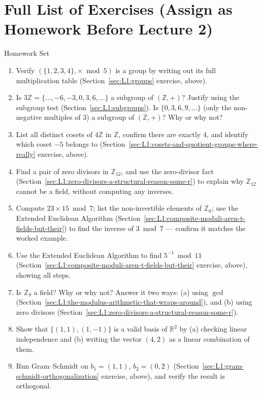 \section{Full List of Exercises (Assign as Homework Before Lecture 2)}
\label{sec:L1:full-list-of-exercises-assign-as-homewor}

\begin{exercisebox}{Homework Set}
\begin{enumerate}[leftmargin=*]
  \item Verify $(\{1,2,3,4\}, \times \bmod 5)$ is a group by writing out its full multiplication table (Section~\ref{sec:L1:groups} exercise, above).
  \item Is $3\mathbb{Z} = \{\ldots,-6,-3,0,3,6,\ldots\}$ a subgroup of $(\mathbb{Z},+)$? Justify using the subgroup test (Section~\ref{sec:L1:subgroups}). Is $\{0,3,6,9,\ldots\}$ (only the non-negative multiples of $3$) a subgroup of $(\mathbb{Z},+)$? Why or why not?
  \item List all distinct cosets of $4\mathbb{Z}$ in $\mathbb{Z}$, confirm there are exactly $4$, and identify which coset $-5$ belongs to (Section~\ref{sec:L1:cosets-and-quotient-groups-where-really} exercise, above).
  \item Find a pair of zero divisors in $\mathbb{Z}_{12}$, and use the zero-divisor fact (Section~\ref{sec:L1:zero-divisors-a-structural-reason-some-r}) to explain why $\mathbb{Z}_{12}$ cannot be a field, without computing any inverses.
  \item Compute $23 \times 15 \bmod 7$; list the non-invertible elements of $\mathbb{Z}_8$; use the Extended Euclidean Algorithm (Section~\ref{sec:L1:composite-moduli-aren-t-fields-but-their}) to find the inverse of $3 \bmod 7$ --- confirm it matches the worked example.
  \item Use the Extended Euclidean Algorithm to find $5^{-1} \bmod 11$ (Section~\ref{sec:L1:composite-moduli-aren-t-fields-but-their} exercise, above), showing all steps.
  \item Is $\mathbb{Z}_9$ a field? Why or why not? Answer it two ways: (a) using $\gcd$ (Section~\ref{sec:L1:the-modulus-arithmetic-that-wraps-around}), and (b) using zero divisors (Section~\ref{sec:L1:zero-divisors-a-structural-reason-some-r}).
  \item Show that $\{(1,1), (1,-1)\}$ is a valid basis of $\mathbb{R}^2$ by (a) checking linear independence and (b) writing the vector $(4,2)$ as a linear combination of them.
  \item Run Gram--Schmidt on $b_1=(1,1)$, $b_2=(0,2)$ (Section~\ref{sec:L1:gram-schmidt-orthogonalization} exercise, above), and verify the result is orthogonal.

\end{enumerate}
\end{exercisebox}
